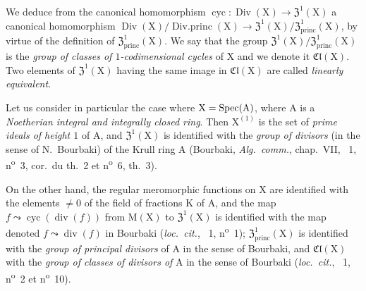 \begin{env}[21.6.7]
We deduce from the canonical homomorphism $\operatorname{cyc}:\operatorname{Div}(\mathrm{X})\to\mathfrak{Z}^1(\mathrm{X})$ a canonical homomorphism $\operatorname{Div}(\mathrm{X})/\operatorname{Div.princ}(\mathrm{X})\to\mathfrak{Z}^1(\mathrm{X})/\mathfrak{Z}^1_\mathrm{princ}(\mathrm{X})$, by virtue of the definition of $\mathfrak{Z}^1_\mathrm{princ}(\mathrm{X})$.
We say that the group $\mathfrak{Z}^1(\mathrm{X})/\mathfrak{Z}^1_\mathrm{princ}(\mathrm{X})$ is the \emph{group of classes of $1$-codimensional cycles} of $\mathrm{X}$ and we denote it $\mathfrak{Cl}(\mathrm{X})$.
Two elements of $\mathfrak{Z}^1(\mathrm{X})$ having the same image in $\mathfrak{Cl}(\mathrm{X})$ are called \emph{linearly equivalent}.
\end{env}

\begin{env}[21.6.8]
\label{IV.21.6.8}
Let us consider in particular the case where $\mathrm{X}=\operatorname{Spec}(\mathrm{A})$, where $\mathrm{A}$ is a \emph{Noetherian integral and integrally closed ring}.
Then $\mathrm{X}^{(1)}$ is the set of \emph{prime ideals of height $1$} of $\mathrm{A}$, and $\mathfrak{Z}^1(\mathrm{X})$ is identified with the \emph{group of divisors} (in the sense of N.~Bourbaki) of the Krull ring $\mathrm{A}$ (Bourbaki, \emph{Alg.\ comm.}, chap.~VII, \textsection~1, n\textsuperscript{o}~3, cor.\ du th.~2 et n\textsuperscript{o}~6, th.~3).

On the other hand, the regular meromorphic functions on $\mathrm{X}$ are identified with the elements $\neq 0$ of the field of fractions $\mathrm{K}$ of $\mathrm{A}$, and the map $f\leadsto\operatorname{cyc}(\operatorname{div}(f))$ from $\mathrm{M}(\mathrm{X})$ to $\mathfrak{Z}^1(\mathrm{X})$ is identified with the map denoted $f\leadsto\operatorname{div}(f)$ in Bourbaki (\emph{loc.\ cit.}, \textsection~1, n\textsuperscript{o}~1);
$\mathfrak{Z}^1_\mathrm{princ}(\mathrm{X})$ is identified with the \emph{group of principal divisors} of $\mathrm{A}$ in the sense of Bourbaki, and $\mathfrak{Cl}(\mathrm{X})$ with the \emph{group of classes of divisors of} $\mathrm{A}$ in the sense of Bourbaki (\emph{loc.\ cit.}, \textsection~1, n\textsuperscript{o}~2 et n\textsuperscript{o}~10).
\end{env}

